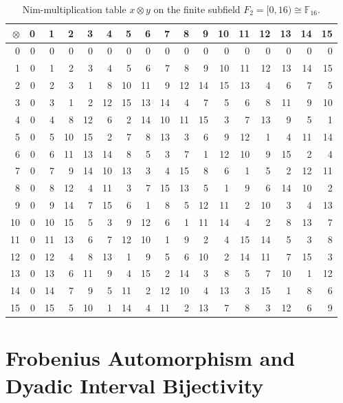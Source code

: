 \documentclass[11pt]{article}
\theoremstyle{definition}
\theoremstyle{remark}
\newcommand{\nimmul}{\otimes}
\newcommand{\F}{\mathbb{F}}
\begin{document}
\begin{table}[htbp]
\centering
\caption{Nim-multiplication table $x \nimmul y$ on the finite subfield $F_2 = [0, 16) \cong \F_{16}$.}
\label{tab:nim16}
\vspace{0.4em}
\footnotesize
\setlength{\tabcolsep}{4.2pt}
\renewcommand{\arraystretch}{1.12}
\begin{tabular}{r|rrrrrrrrrrrrrrrr}
\hline
$\nimmul$ & 0 & 1 & 2 & 3 & 4 & 5 & 6 & 7 & 8 & 9 & 10 & 11 & 12 & 13 & 14 & 15 \\
\hline
0  & 0 & 0 & 0 & 0 & 0 & 0 & 0 & 0 & 0 & 0 & 0 & 0 & 0 & 0 & 0 & 0 \\
1  & 0 & 1 & 2 & 3 & 4 & 5 & 6 & 7 & 8 & 9 & 10 & 11 & 12 & 13 & 14 & 15 \\
2  & 0 & 2 & 3 & 1 & 8 & 10 & 11 & 9 & 12 & 14 & 15 & 13 & 4 & 6 & 7 & 5 \\
3  & 0 & 3 & 1 & 2 & 12 & 15 & 13 & 14 & 4 & 7 & 5 & 6 & 8 & 11 & 9 & 10 \\
4  & 0 & 4 & 8 & 12 & 6 & 2 & 14 & 10 & 11 & 15 & 3 & 7 & 13 & 9 & 5 & 1 \\
5  & 0 & 5 & 10 & 15 & 2 & 7 & 8 & 13 & 3 & 6 & 9 & 12 & 1 & 4 & 11 & 14 \\
6  & 0 & 6 & 11 & 13 & 14 & 8 & 5 & 3 & 7 & 1 & 12 & 10 & 9 & 15 & 2 & 4 \\
7  & 0 & 7 & 9 & 14 & 10 & 13 & 3 & 4 & 15 & 8 & 6 & 1 & 5 & 2 & 12 & 11 \\
8  & 0 & 8 & 12 & 4 & 11 & 3 & 7 & 15 & 13 & 5 & 1 & 9 & 6 & 14 & 10 & 2 \\
9  & 0 & 9 & 14 & 7 & 15 & 6 & 1 & 8 & 5 & 12 & 11 & 2 & 10 & 3 & 4 & 13 \\
10 & 0 & 10 & 15 & 5 & 3 & 9 & 12 & 6 & 1 & 11 & 14 & 4 & 2 & 8 & 13 & 7 \\
11 & 0 & 11 & 13 & 6 & 7 & 12 & 10 & 1 & 9 & 2 & 4 & 15 & 14 & 5 & 3 & 8 \\
12 & 0 & 12 & 4 & 8 & 13 & 1 & 9 & 5 & 6 & 10 & 2 & 14 & 11 & 7 & 15 & 3 \\
13 & 0 & 13 & 6 & 11 & 9 & 4 & 15 & 2 & 14 & 3 & 8 & 5 & 7 & 10 & 1 & 12 \\
14 & 0 & 14 & 7 & 9 & 5 & 11 & 2 & 12 & 10 & 4 & 13 & 3 & 15 & 1 & 8 & 6 \\
15 & 0 & 15 & 5 & 10 & 1 & 14 & 4 & 11 & 2 & 13 & 7 & 8 & 3 & 12 & 6 & 9 \\
\hline
\end{tabular}
\end{table}

\section{Frobenius Automorphism and Dyadic Interval Bijectivity}
\end{document}
